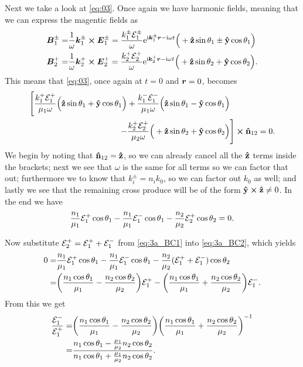 \documentclass[11pt,letter, swedish, english
]{article}
\begin{document}
Next we take a look at \eqref{eq:03}. Once again we have harmonic
fields, meaning that we can express the magentic fields as
\begin{equation}
\begin{aligned}
\vb*B_1^\pm=&\frac{1}{\omega}\vb*k_1^\pm\cross\vb*E_1^\pm
=\frac{k_1^\pm\mathcal{E}_1^\pm}{\omega}
\mathrm{e}^{\mathrm{i} \vb*k_1^\pm\vb*r -\mathrm{i}\omega t}
\Big(+\vu{z}\sin\theta_1 \pm \vu{y}\cos\theta_1 \Big)
\\
\vb*B_2^+=&\frac{1}{\omega}\vb*{k}_2^+\cross\vb*E_2^+
=\frac{k_2^+\mathcal{E}_2^+}{\omega}
\mathrm{e}^{\mathrm{i} \vb*k_2^+\vb*r -\mathrm{i}\omega t}
\Big(+\vu{z}\sin\theta_2 + \vu{y}\cos\theta_2 \Big).
\end{aligned}
\end{equation}
This means that \eqref{eq:03}, once again at $t=0$ and $\vb*r=0$,
becomes 
\begin{equation}
\begin{aligned}
\Bigg[\frac{k_1^+\mathcal{E}_1^+}{\mu_1\omega}
\Big(\vu{z}\sin\theta_1 + \vu{y}\cos\theta_1 \Big)
+\frac{k_1^-\mathcal{E}_1^-}{\mu_1\omega}
\Big(\vu{z}\sin\theta_1 - \vu{y}\cos\theta_1 \Big)&\\
-\frac{k_2^+\mathcal{E}_2^+}{\mu_2\omega}
\Big(+\vu{z}\sin\theta_2 + \vu{y}\cos\theta_2 \Big)
&\Bigg]
\cross\vu{n}_{12} = 0.
\end{aligned}
\end{equation}
We begin by noting that $\vu{n}_{12}=\vu{z}$, so we can already cancel
all the $\vu{z}$ terms inside the brackets; next we see that $\omega$
is the same for all terms so we can factor that out; furthermore we
to know that $k_i^\pm = n_ik_0$, so we can factor out $k_0$ as
well; and lastly we see that the remaining cross produce will be of
the form $\vu{y}\cross\vu{z}\neq0$. In the end we have
\begin{equation}\label{eq:3a_BC2}
\frac{n_1}{\mu_1}{\mathcal{E}_1^+}\cos\theta_1 
-\frac{n_1}{\mu_1}{\mathcal{E}_1^-}\cos\theta_1
-\frac{n_2}{\mu_2}{\mathcal{E}_2^+}\cos\theta_2 
 = 0.
\end{equation}

Now substitute ${\mathcal{E}_2^+} = {\mathcal{E}_1^+}+{\mathcal{E}_1^-}$ from \eqref{eq:3a_BC1} into
\eqref{eq:3a_BC2}, which yields
\begin{equation}
\begin{aligned}
0 =& 
\frac{n_1}{\mu_1}{\mathcal{E}_1^+}\cos\theta_1 
-\frac{n_1}{\mu_1}{\mathcal{E}_1^-}\cos\theta_1
-\frac{n_2}{\mu_2}({\mathcal{E}_1^+}+{\mathcal{E}_1^-})
\cos\theta_2 
\\ =&
\qty(\frac{n_1\cos\theta_1}{\mu_1}-\frac{n_2\cos\theta_2}{\mu_2}){\mathcal{E}_1^+}
-\qty(\frac{n_1\cos\theta_1}{\mu_1}+\frac{n_2\cos\theta_2}{\mu_2}){\mathcal{E}_1^-}.
\end{aligned}
\end{equation}
From this we get
\begin{equation}
\begin{aligned}
\frac{{\mathcal{E}_1^-}}{{\mathcal{E}_1^+}}=&
\qty(\frac{n_1\cos\theta_1}{\mu_1}-\frac{n_2\cos\theta_2}{\mu_2})
\qty(\frac{n_1\cos\theta_1}{\mu_1}+\frac{n_2\cos\theta_2}{\mu_2})^{-1}\\
=&\frac{n_1\cos\theta_1 - \frac{\mu_1}{\mu_2}n_2\cos\theta_2}
{n_1\cos\theta_1 + \frac{\mu_1}{\mu_2}n_2\cos\theta_2}.
\end{aligned}
\end{equation}
\end{document}
